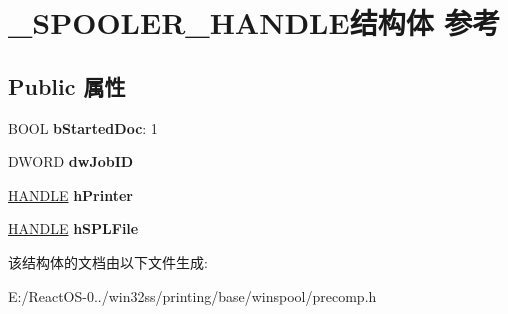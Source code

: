 \hypertarget{struct___s_p_o_o_l_e_r___h_a_n_d_l_e}{}\section{\+\_\+\+S\+P\+O\+O\+L\+E\+R\+\_\+\+H\+A\+N\+D\+L\+E结构体 参考}
\label{struct___s_p_o_o_l_e_r___h_a_n_d_l_e}
\subsection*{Public 属性}
\begin{DoxyCompactItemize}
\item 
\mbox{\label{struct___s_p_o_o_l_e_r___h_a_n_d_l_e_a277bcfd3a1fb8bdd671f9d6940866b32}} 
B\+O\+OL {\bfseries b\+Started\+Doc}\+: 1
\item 
\mbox{\label{struct___s_p_o_o_l_e_r___h_a_n_d_l_e_a2d66ab64afeecf3632e13485ee60a08a}} 
D\+W\+O\+RD {\bfseries dw\+Job\+ID}
\item 
\mbox{\label{struct___s_p_o_o_l_e_r___h_a_n_d_l_e_abe255e93bcf060a08e8274567467c4d8}} 
\hyperlink{interfacevoid}{H\+A\+N\+D\+LE} {\bfseries h\+Printer}
\item 
\mbox{\label{struct___s_p_o_o_l_e_r___h_a_n_d_l_e_a70fef67bf04164154bd62b0195da5bf4}} 
\hyperlink{interfacevoid}{H\+A\+N\+D\+LE} {\bfseries h\+S\+P\+L\+File}
\end{DoxyCompactItemize}


该结构体的文档由以下文件生成\+:\begin{DoxyCompactItemize}
\item 
E\+:/\+React\+O\+S-\/0../win32ss/printing/base/winspool/precomp.\+h\end{DoxyCompactItemize}
